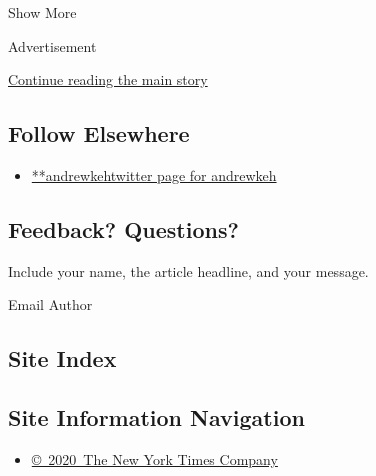 Show More

Advertisement

\protect\hyperlink{after-mid2}{Continue reading the main story}

\hypertarget{follow-elsewhere}{%
\subsection{Follow Elsewhere}\label{follow-elsewhere}}

\begin{itemize}
\tightlist
\item
  \href{https://twitter.com/andrewkeh}{**andrewkehtwitter page for
  andrewkeh}
\end{itemize}

\hypertarget{feedback-questions}{%
\subsection{Feedback? Questions?}\label{feedback-questions}}

Include your name, the article headline, and your message.

Email Author

\hypertarget{site-index}{%
\subsection{Site Index}\label{site-index}}

\hypertarget{site-information-navigation}{%
\subsection{Site Information
Navigation}\label{site-information-navigation}}

\begin{itemize}
\tightlist
\item
  \href{https://help.nytimes3xbfgragh.onion/hc/en-us/articles/115014792127-Copyright-notice}{©~2020~The
  New York Times Company}
\end{itemize}

